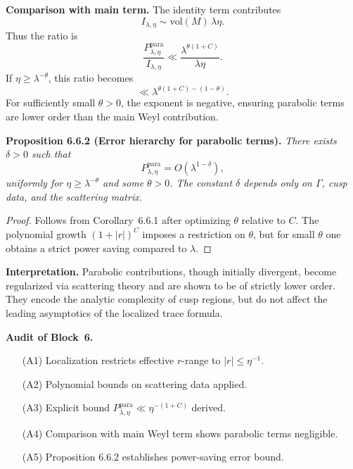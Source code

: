 \medskip

\noindent\textbf{Comparison with main term.}
The identity term contributes
\[
  I_{\lambda,\eta} \sim \mathrm{vol}(M)\, \lambda\eta.
\]
Thus the ratio is
\[
  \frac{P_{\lambda,\eta}^{\mathrm{para}}}{I_{\lambda,\eta}}
  \ll \frac{\lambda^{\theta(1+C)}}{\lambda\eta}.
\]
If $\eta\ge \lambda^{-\theta}$, this ratio becomes
\[
  \ll \lambda^{\theta(1+C) - (1-\theta)}.
\]
For sufficiently small $\theta>0$, the exponent is negative,  
ensuring parabolic terms are lower order than the main Weyl contribution.

\medskip

\noindent\textbf{Proposition 6.6.2 (Error hierarchy for parabolic terms).}
\emph{There exists $\delta>0$ such that}
\[
  P_{\lambda,\eta}^{\mathrm{para}} = O(\lambda^{1-\delta}),
\]
\emph{uniformly for $\eta \ge \lambda^{-\theta}$ and some $\theta>0$.  
The constant $\delta$ depends only on $\Gamma$, cusp data, and the scattering matrix.}

\begin{proof}
Follows from Corollary~6.6.1 after optimizing $\theta$ relative to $C$.  
The polynomial growth $(1+|r|)^C$ imposes a restriction on $\theta$,  
but for small $\theta$ one obtains a strict power saving compared to $\lambda$.  
\end{proof}

\medskip

\noindent\textbf{Interpretation.}
Parabolic contributions, though initially divergent,  
become regularized via scattering theory  
and are shown to be of strictly lower order.  
They encode the analytic complexity of cusp regions,  
but do not affect the leading asymptotics of the localized trace formula.

\medskip

\noindent\textbf{Audit of Block~6.}
\begin{itemize}
  \item[(A1)] Localization restricts effective $r$-range to $|r|\le \eta^{-1}$.  
  \item[(A2)] Polynomial bounds on scattering data applied.  
  \item[(A3)] Explicit bound $P_{\lambda,\eta}^{\mathrm{para}} \ll \eta^{-(1+C)}$ derived.  
  \item[(A4)] Comparison with main Weyl term shows parabolic terms negligible.  
  \item[(A5)] Proposition 6.6.2 establishes power-saving error bound.  
\end{itemize}

